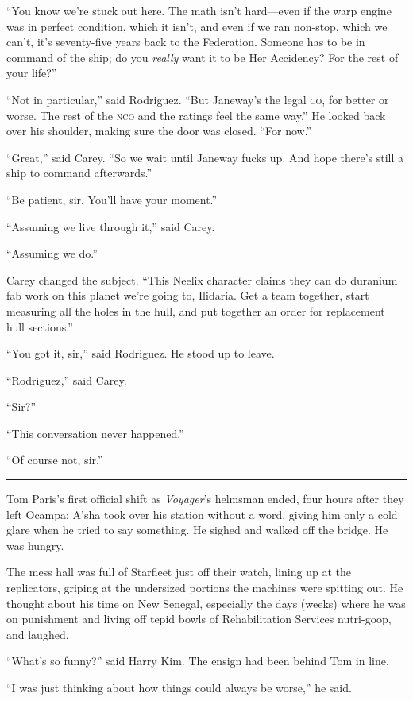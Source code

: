 \documentclass[twoside,letterpaper,12pt]{memoir}
\begin{document}
``You know we’re stuck out here. The math isn’t hard—even if the warp engine was in perfect condition, which it isn’t, and even if we ran non-stop, which we can’t, it’s seventy-five years back to the Federation. Someone has to be in command of the ship; do you \textit{really }want it to be Her Accidency? For the rest of your life?'' 

``Not in particular,'' said Rodriguez. ``But Janeway’s the legal \textsc{co}, for better or worse. The rest of the \textsc{nco} and the ratings feel the same way.'' He looked back over his shoulder, making sure the door was closed. ``For now.'' 

``Great,'' said Carey. ``So we wait until Janeway fucks up. And hope there’s still a ship to command afterwards.'' 

``Be patient, sir. You’ll have your moment.'' 

``Assuming we live through it,'' said Carey. 

``Assuming we do.'' 

Carey changed the subject. ``This Neelix character claims they can do duranium fab work on this planet we’re going to, Ilidaria. Get a team together, start measuring all the holes in the hull, and put together an order for replacement hull sections.'' 

``You got it, sir,'' said Rodriguez. He stood up to leave. 

``Rodriguez,'' said Carey. 

``Sir?'' 

``This conversation never happened.'' 

``Of course not, sir.'' 

\fancybreak{\rule{3cm}{0.4 pt}} 

Tom Paris’s first official shift as \textit{Voyager}’s helmsman ended, four hours after they left Ocampa; A’sha took over his station without a word, giving him only a cold glare when he tried to say something. He sighed and walked off the bridge. He was hungry. 

The mess hall was full of Starfleet just off their watch, lining up at the replicators, griping at the undersized portions the machines were spitting out. He thought about his time on New Senegal, especially the days (weeks) where he was on punishment and living off tepid bowls of Rehabilitation Services nutri-goop, and laughed. 

``What’s so funny?'' said Harry Kim. The ensign had been behind Tom in line. 

``I was just thinking about how things could always be worse,'' he said. 
\end{document}

